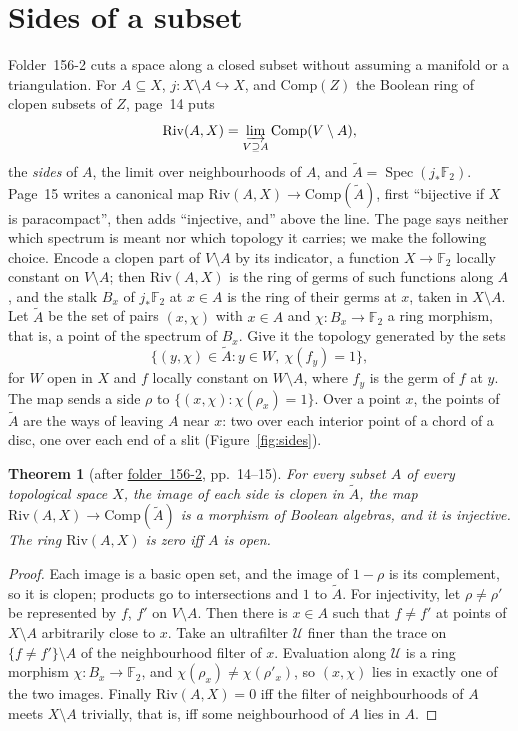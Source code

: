 \documentclass[11pt,a4paper]{amsart}
\newtheorem{theorem}{Theorem}[section]
\theoremstyle{definition}
\theoremstyle{remark}
\newcommand{\fac}[1]{\href{https://grothendieck.umontpellier.fr/#1.pdf}{folder~#1}}
\begin{document}
\section{Sides of a subset}\label{sec:sides}

Folder~156-2 cuts a space along a closed subset without assuming a manifold or a triangulation. For $A \subseteq X$, $j\colon X \setminus A \hookrightarrow X$, and $\mathrm{Comp}(Z)$ the Boolean ring of clopen subsets of $Z$, page~14 puts
\[
\mathrm{Riv}(A, X) = \varinjlim_{V \supseteq A} \mathrm{Comp}(V \setminus A),
\]
the \emph{sides} of $A$, the limit over neighbourhoods of $A$, and $\widetilde A = \operatorname{Spec}(j_*\mathbb F_2)$. Page~15 writes a canonical map $\mathrm{Riv}(A, X) \to \mathrm{Comp}(\widetilde A)$, first ``bijective if $X$ is paracompact'', then adds ``injective, and'' above the line. The page says neither which spectrum is meant nor which topology it carries; we make the following choice. Encode a clopen part of $V \setminus A$ by its indicator, a function $X \to \mathbb F_2$ locally constant on $V \setminus A$; then $\mathrm{Riv}(A, X)$ is the ring of germs of such functions along $A$, and the stalk $B_x$ of $j_*\mathbb F_2$ at $x \in A$ is the ring of their germs at $x$, taken in $X \setminus A$. Let $\widetilde A$ be the set of pairs $(x, \chi)$ with $x \in A$ and $\chi\colon B_x \to \mathbb F_2$ a ring morphism, that is, a point of the spectrum of $B_x$. Give it the topology generated by the sets
\[
\{(y, \chi) \in \widetilde A : y \in W,\ \chi(f_y) = 1\},
\]
for $W$ open in $X$ and $f$ locally constant on $W \setminus A$, where $f_y$ is the germ of $f$ at $y$. The map sends a side $\rho$ to $\{(x, \chi) : \chi(\rho_x) = 1\}$. Over a point $x$, the points of $\widetilde A$ are the ways of leaving $A$ near $x$: two over each interior point of a chord of a disc, one over each end of a slit (Figure~\ref{fig:sides}).

\begin{theorem}[after \fac{156-2}, pp.~14--15]\label{thm:sides}
For every subset $A$ of every topological space $X$, the image of each side is clopen in $\widetilde A$, the map $\mathrm{Riv}(A, X) \to \mathrm{Comp}(\widetilde A)$ is a morphism of Boolean algebras, and it is injective. The ring $\mathrm{Riv}(A, X)$ is zero iff $A$ is open.
\end{theorem}

\begin{proof}
Each image is a basic open set, and the image of $1 - \rho$ is its complement, so it is clopen; products go to intersections and $1$ to $\widetilde A$. For injectivity, let $\rho \ne \rho'$ be represented by $f$, $f'$ on $V \setminus A$. Then there is $x \in A$ such that $f \ne f'$ at points of $X \setminus A$ arbitrarily close to $x$. Take an ultrafilter $\mathcal U$ finer than the trace on $\{f \ne f'\} \setminus A$ of the neighbourhood filter of $x$. Evaluation along $\mathcal U$ is a ring morphism $\chi\colon B_x \to \mathbb F_2$, and $\chi(\rho_x) \ne \chi(\rho'_x)$, so $(x, \chi)$ lies in exactly one of the two images. Finally $\mathrm{Riv}(A, X) = 0$ iff the filter of neighbourhoods of $A$ meets $X \setminus A$ trivially, that is, iff some neighbourhood of $A$ lies in $A$.
\end{proof}
\end{document}
